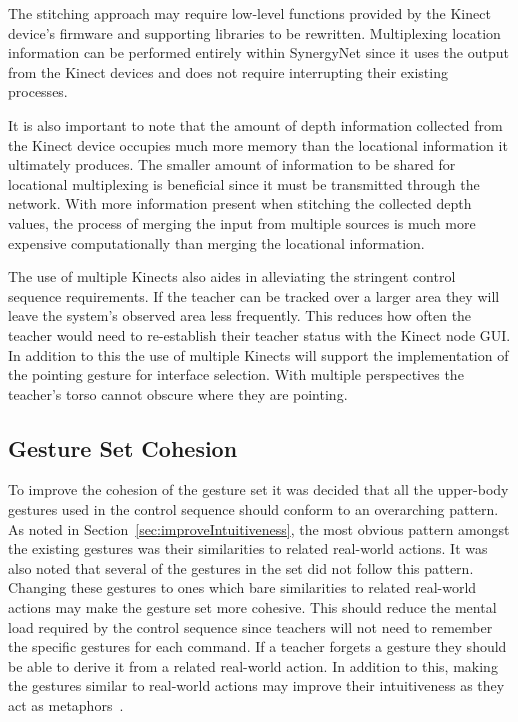 \documentclass[manuscript, review, screen]{acmart}
\begin{document}
The stitching approach may require low-level functions provided by the Kinect device's firmware and supporting libraries to be rewritten.
Multiplexing location information can be performed entirely within SynergyNet since it uses the output from the Kinect devices and does not require interrupting their existing processes.

It is also important to note that the amount of depth information collected from the Kinect device occupies much more memory than the locational information it ultimately produces.
The smaller amount of information to be shared for locational multiplexing is beneficial since it must be transmitted through the network.
With more information present when stitching the collected depth values, the process of merging the input from multiple sources is much more expensive computationally than merging the locational information.

The use of multiple Kinects also aides in alleviating the stringent control sequence requirements.
If the teacher can be tracked over a larger area they will leave the system's observed area less frequently.
This reduces how often the teacher would need to re-establish their teacher status with the Kinect node GUI.
In addition to this the use of multiple Kinects will support the implementation of the pointing gesture for interface selection.
With multiple perspectives the teacher's torso cannot obscure where they are pointing.

\subsection{Gesture Set Cohesion} 

To improve the cohesion of the gesture set it was decided that all the upper-body gestures used in the control sequence should conform to an overarching pattern.
As noted in Section~\ref{sec:improveIntuitiveness}, the most obvious pattern amongst the existing gestures was their similarities to related real-world actions.
It was also noted that several of the gestures in the set did not follow this pattern.
Changing these gestures to ones which bare similarities to related real-world actions may make the gesture set more cohesive.
This should reduce the mental load required by the control sequence since teachers will not need to remember the specific gestures for each command.
If a teacher forgets a gesture they should be able to derive it from a related real-world action.
In addition to this, making the gestures similar to real-world actions may improve their intuitiveness as they act as metaphors~\cite{Wang2008}.
\end{document}
